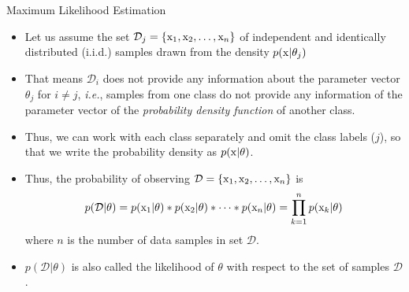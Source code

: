 \begin{frame}{Maximum Likelihood Estimation}
\begin{small}
\begin{itemize}
\item Let us assume the set $\mathcal{D}_j = \{{\rm x}_1,{\rm x}_2,\ldots,{\rm x}_n\}$ of independent
and identically distributed (i.i.d.) samples drawn from the
density $p({\rm x}|\theta_j)$ 
\item That means $\mathcal{D}_i$ does not provide any information about the parameter vector $\theta_j$ for $i\neq j$, \textit{i.e.}, samples from one class do not provide any information of the parameter vector of the \textit{\color{mycolor1}probability density function} of another class.
\item Thus, we can work with each class separately and omit the class labels ($j$), so that we write the probability density as  $p({\rm x}|\theta)$.
\item Thus, the probability of observing $\mathcal{D} =\{{\rm x}_1,{\rm x}_2,\ldots,{\rm x}_n\}$ is
\begin{equation}
p(\mathcal{D}| \theta ) =p({\rm x}_1|\theta)*p({\rm x}_2|\theta)*\cdots*p({\rm x}_n|\theta) = \prod\limits_{k = 1}^n {p({{\rm x}_k}|\theta )}\nonumber
\end{equation}
where $n$ is the number of data samples in set $\mathcal{D}$.
\item $p(\mathcal{D}|\theta)$ is also called the likelihood of $\theta$ with respect to the set of samples $\mathcal{D}$.
\end{itemize}
\end{small}
\end{frame}

